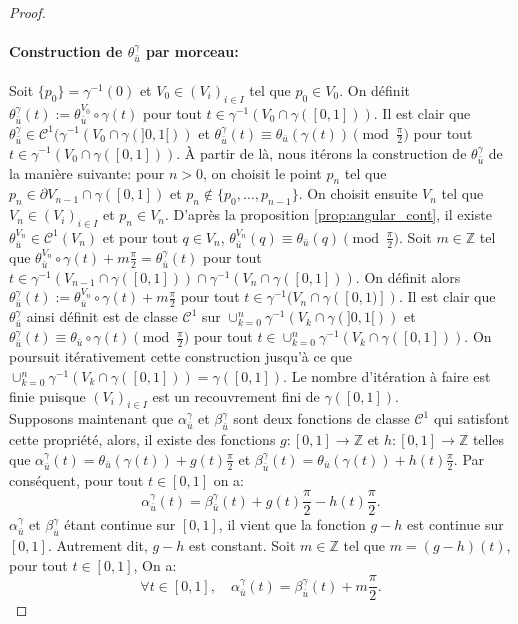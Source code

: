 \begin{proof}
    \paragraph{Construction de $\theta_{\bar{u}}^\gamma$ par morceau:} Soit $\{p_0\}=\gamma^{-1}(0)$ et $V_0\in(V_i)_{i\in I}$ tel que $p_0\in V_0$. On définit $\theta_{\bar{u}}^\gamma(t):=\theta_{\bar{u}}^{V_0}\circ\gamma(t)$ pour tout $t\in\gamma^{-1}(V_0\cap\gamma([0, 1]))$. Il est clair que $\theta_{\bar{u}}^\gamma\in\mathcal{C}^1(\gamma^{-1}(V_0\cap\gamma(]0, 1[))$ et $\theta_{\bar{u}}^\gamma(t)\equiv\theta_{\bar{u}}(\gamma(t))\pmod{\frac{\pi}{2}}$ pour tout $t\in\gamma^{-1}(V_0\cap\gamma([0, 1]))$. À partir de là, nous itérons la construction de $\theta^\gamma_{\bar{u}}$ de la manière suivante: pour $n>0$, on choisit le point $p_n$ tel que $p_n\in\partial V_{n-1}\cap\gamma([0, 1])$ et $p_n\notin\{p_0,\dots,p_{n-1}\}$. On choisit ensuite $V_n$ tel que $V_n\in(V_i)_{i\in I}$ et $p_n\in V_n$. D'après la proposition \ref{prop:angular_cont}, il existe $\theta_{\bar{u}}^{V_n}\in\mathcal{C}^1(V_n)$ et pour tout $q\in V_n$, $\theta_{\bar{u}}^{V_n}(q)\equiv\theta_{\bar{u}}(q)\pmod{\frac{\pi}{2}}$. Soit $m\in\mathbb{Z}$ tel que $\theta^{V_n}_{\bar{u}}\circ\gamma(t)+m\frac{\pi}{2}=\theta^\gamma_{\bar{u}}(t)$ pour tout $t\in\gamma^{-1}(V_{n-1}\cap\gamma([0, 1]))\cap\gamma^{-1}(V_n\cap\gamma([0, 1]))$. On définit alors $\theta_{\bar{u}}^\gamma(t):=\theta^{V_n}_{\bar{u}}\circ\gamma(t)+m\frac{\pi}{2}$ pour tout $t\in\gamma^{-1}(V_n\cap\gamma([0, 1)])$. Il est clair que $\theta_{\bar{u}}^\gamma$ ainsi définit est de classe $\mathcal{C}^1$ sur $\cup_{k=0}^n\gamma^{-1}(V_k\cap\gamma(]0, 1[))$ et $\theta_{\bar{u}}^\gamma(t)\equiv\theta_{\bar{u}}\circ\gamma(t)\pmod{\frac{\pi}{2}}$ pour tout $t\in\cup_{k=0}^n\gamma^{-1}(V_k\cap\gamma([0, 1]))$. On poursuit itérativement cette construction jusqu'à ce que $\cup_{k=0}^n\gamma^{-1}(V_k\cap\gamma([0, 1]))=\gamma([0, 1])$. Le nombre d'itération à faire est finie puisque $(V_i)_{i\in I}$ est un recouvrement fini de $\gamma([0, 1])$.
    \[\]
    Supposons maintenant que $\alpha_{\bar{u}}^\gamma$ et $\beta_{\bar{u}}^\gamma$ sont deux fonctions de classe $\mathcal{C}^1$ qui satisfont cette propriété, alors, il existe des fonctions $g:[0, 1]\longrightarrow\mathbb{Z}$ et $h:[0, 1]\longrightarrow\mathbb{Z}$ telles que $\alpha^\gamma_{\bar{u}}(t) = \theta_{\bar{u}}(\gamma(t)) + g(t)\frac{\pi}{2}$ et $\beta^\gamma_{\bar{u}}(t) =\theta_{\bar{u}}(\gamma(t)) + h(t)\frac{\pi}{2}$. Par conséquent, pour tout $t\in[0, 1]$ on a:
    $$\alpha_{\bar{u}}^\gamma(t) = \beta_{\bar{u}}^\gamma(t) + g(t)\frac{\pi}{2}-h(t)\frac{\pi}{2}.$$
    $\alpha^\gamma_{\bar{u}}$ et $\beta^\gamma_{\bar{u}}$ étant continue sur $[0, 1]$, il vient que la fonction $g-h$ est continue sur $[0, 1]$. Autrement dit, $g-h$ est constant. Soit $m\in\mathbb{Z}$ tel que $m=(g-h)(t)$, pour tout $t\in[0, 1]$, On a:
    $$\forall t\in[0, 1],\quad\alpha_{\bar{u}}^\gamma(t) = \beta_{\bar{u}}^\gamma(t) + m\frac{\pi}{2}.$$
\end{proof}

